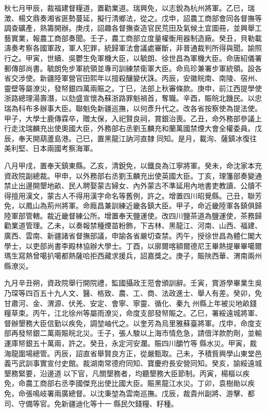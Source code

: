 \begin{pinyinscope}
秋七月甲辰，裁福建督糧道，置勸業道。瑞興免，以志銳為杭州將軍。乙巳，瑞澂、楊文鼎奏湘省匪勢蔓延，擬行清鄉法，從之。戊申，詔農工商部會同各督撫等調查礦產，熟籌開辦。庚戌，詔趣各督撫查造官民荒田及氣候土宜圖冊，並興舉工藝實業，報農工商部奏聞。壬子，農工商部立度量權衡用器制造廠。癸丑，貝勒載濤奏考察各國軍政，軍人犯罪，統歸軍法會議處審斷，非普通裁判所得與聞。諭照行之。甲寅，世續、吳鬱生免軍機大臣，以毓朗、徐世昌為軍機大臣。命唐紹儀署郵傳部尚書。毓朗免步軍統領並專司訓練禁衛軍大臣。命烏珍兼署步軍統領。設各省交涉使。新疆陸軍營官田熙年以擅殺釀變伏誅。丙辰，安徽皖南、南陵、宿州、靈壁等屬潦災，發帑銀四萬兩賑之。丁巳，法部上秋審條款。庚申，前江西提學使浙路總理湯壽潛，以劾盛宣懷為蘇浙路罪魁禍首，奪職。辛酉，賑皖北饑民。以忠瑞為科布多辦事大臣。聯魁免新疆巡撫，以何彥升代之。改各省按察使為提法使。甲子，大學士鹿傳霖卒，贈太保，入祀賢良祠，賞銀治喪。乙丑，命外務部參議上行走沈瑞麟充出使奧國大臣，外務部右丞劉玉麟充和蘭萬國禁煙大會全權委員。戊辰，奉天開葫蘆島港。己巳，置黑龍江訥河直隸同知。是月，載洵、薩鎮冰復往美利堅、日本兩國考察海軍。

八月甲戌，置奉天鎮東縣。乙亥，清銳免，以鐵良為江寧將軍。癸未，命沈家本充資政院副總裁。甲申，以外務部右丞劉玉麟充出使英國大臣。丁亥，理籓部奏變通禁止出邊開墾地畝、民人聘娶蒙古婦女、內外蒙古不準延用內地書吏教讀、公牘不得擅用漢文，蒙古人不得用漢字命名等舊例，許之。增置四川昭覺縣。己丑，聯芳免，以鳳山為荊州將軍。命廕昌兼訓練近畿各鎮大臣。甲子，命近畿陸軍各鎮俱歸陸軍部管轄。裁近畿督練公所。增置奉天鹽運使。改四川鹽茶道為鹽運使，茶務歸勸業道管理。乙未，以奏報禁種煙苗粉飾，下吉林、黑龍江、河南、山西、福建、廣西、雲南、新疆諸省督撫部議，申諭各省嚴切查禁。丙午，授徐世昌為體仁閣大學士，以吏部尚書李殿林協辦大學士。丁酉，以廓爾喀額爾德尼王畢熱提畢畢噶爾瑪生寫熱曾噶扒噶都熱薩哈拒西藏求援兵，詔嘉獎之。庚子，賑陜西華、渭南兩州縣潦災。

九月辛丑朔，資政院舉行開院禮，監國攝政王蒞會頒訓辭。壬寅，賞游學畢業生吳乃琛等四百五十九人文、醫、格致、農、工、商、法政進士、舉人有差。癸卯，免甘肅河、金、渭源、伏羌、安定、會寧、寧靈、循化、秦九州縣上年被災地畝錢糧草束。丙午，江北徐州等屬雨潦災，命度支部發帑賑之。乙巳，署綏遠城將軍、督辦墾務大臣信勤以疾免，調堃岫代之。以奎芳為烏里雅蘇臺將軍。戊申，命度支部再發帑銀二萬兩賑皖北災。壬子，張人駿以上海市情危急，請借洋款酌劑，並輸運庫帑銀五十萬兩，許之。癸丑，永定河安瀾。賑四川釂竹等縣水災。甲寅，裁海龍圍場總管。丙辰，詔直省舉賢良方正，從嚴甄取。己未，予積貲興學山東堂邑義丐武訓事實宣付史館。裁湖南常德府同知、寶慶府長安營同知。癸亥，諭綏遠城墾務緊要，沿邊道以下官，凡關墾務者，均聽墾務大臣節制。丙寅，楊樞以疾免，命農工商部右丞李國傑充出使比國大臣。賑黑龍江水災。丁卯，袁樹勛以疾免，命張鳴岐署兩廣總督。以沈秉堃為雲南巡撫。戊辰，裁貴州副將、游擊、都司、守備等官。免新疆迪化等十一縣民欠錢糧、籽種。


\end{pinyinscope}
